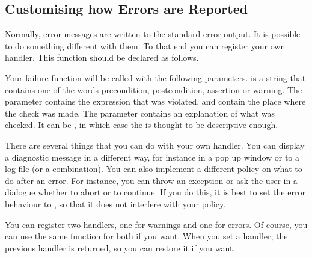 \begin{ccAdvanced}

\subsection{Customising how Errors are Reported}

Normally, error messages are written to the standard error output.
It is possible to do something different with them.
To that end you can register your own handler.
This function should be declared as follows.

\ccTexHtml{\begin{samepage}}{}
\renewcommand{\ccLongParamLayout}{\ccTrue}

\lcTex{\ccAutoIndexingOff}
\ccTexHtml{\end{samepage}}{}
\lcTex{\ccAutoIndexingOn}

Your failure function will be called with the following parameters.
 is a string that contains one of the words precondition,
postcondition, assertion or warning. 
The parameter  contains the expression that was violated.
 and  contain the place where the check was made.
The  parameter contains an explanation of what was 
checked. 
It can be , in which case the  is thought
to be descriptive enough.

There are several things that you can do with your own handler.
You can display a diagnostic message in a different way, for instance in 
a pop up window or to a log file (or a combination).
You can also implement a different policy on what to do after an error.
For instance, you can throw an exception or ask the user in a dialogue 
whether to abort or to continue.
If you do this, it is best to set the error behaviour to
, so that it does not interfere with your policy.

You can register two handlers, one for warnings and one for errors.
Of course, you can use the same function for both if you want.
When you set a handler, the previous handler is returned, so you can restore
it if you want.


\ccGlueBegin
{}


\end{ccAdvanced}
